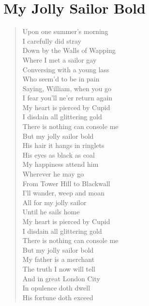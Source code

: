 \documentclass[11pt]{article}
\begin{document}
\section{My Jolly Sailor Bold}
\label{sec:org7800c8d}
\begin{verse}
Upon one summer's morning\\
I carefully did stray\\
Down by the Walls of Wapping\\
Where I met a sailor gay\\
\vspace*{1em}
Conversing with a young lass\\
Who seem'd to be in pain\\
Saying, William, when you go\\
I fear you'll ne'er return again\\
\vspace*{1em}
My heart is pierced by Cupid\\
I disdain all glittering gold\\
There is nothing can console me\\
But my jolly sailor bold\\
\vspace*{1em}
His hair it hangs in ringlets\\
His eyes as black as coal\\
My happiness attend him\\
Wherever he may go\\
\vspace*{1em}
From Tower Hill to Blackwall\\
I'll wander, weep and moan\\
All for my jolly sailor\\
Until he sails home\\
\vspace*{1em}
My heart is pierced by Cupid\\
I disdain all glittering gold\\
There is nothing can console me\\
But my jolly sailor bold\\
\vspace*{1em}
My father is a merchant\\
The truth I now will tell\\
And in great London City\\
In opulence doth dwell\\
\vspace*{1em}
His fortune doth exceed\\

\end{verse}
\end{document}
